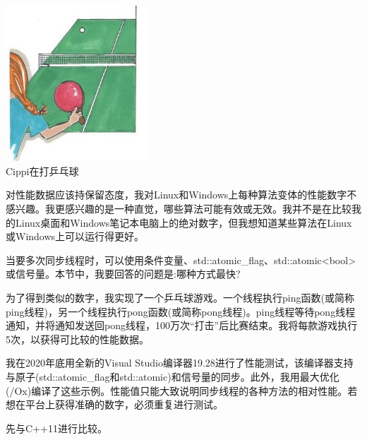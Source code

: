 
\begin{center}
\includegraphics[width=0.4\textwidth]{content/3/chapter7/images/1.png}\\
Cippi在打乒乓球
\end{center}

\begin{tcolorbox}[breakable,enhanced jigsaw,colback=blue!5!white,colframe=blue!75!black,title={具体设备的性能参考}]
对性能数据应该持保留态度，我对Linux和Windows上每种算法变体的性能数字不感兴趣。我更感兴趣的是一种直觉，哪些算法可能有效或无效。我并不是在比较我的Linux桌面和Windows笔记本电脑上的绝对数字，但我想知道某些算法在Linux或Windows上可以运行得更好。
\end{tcolorbox}

当要多次同步线程时，可以使用条件变量、std::atomic\_flag、std::atomic<bool>或信号量。本节中，我要回答的问题是:哪种方式最快?

为了得到类似的数字，我实现了一个乒乓球游戏。一个线程执行ping函数(或简称ping线程)，另一个线程执行pong函数(或简称pong线程)。ping线程等待pong线程通知，并将通知发送回pong线程，100万次“打击”后比赛结束。我将每款游戏执行5次，以获得可比较的性能数据。

\begin{tcolorbox}[breakable,enhanced jigsaw,colback=blue!5!white,colframe=blue!75!black,title={关于数字}]
我在2020年底用全新的Visual Studio编译器19.28进行了性能测试，该编译器支持与原子(std::atomic\_flag和std::atomic)和信号量的同步。此外，我用最大优化(/Ox)编译了这些示例。性能值只能大致说明同步线程的各种方法的相对性能。若想在平台上获得准确的数字，必须重复进行测试。
\end{tcolorbox}

先与C++11进行比较。


